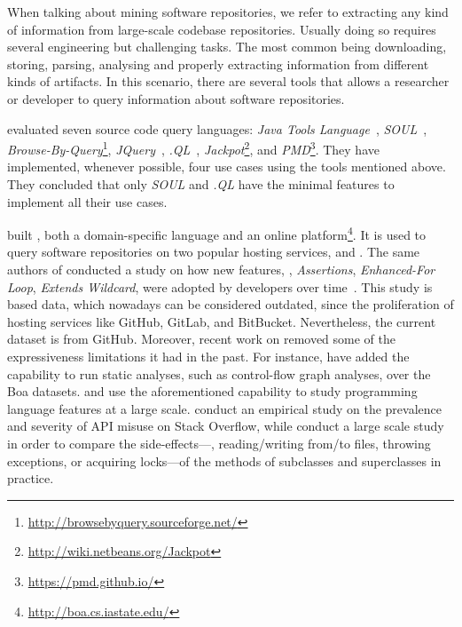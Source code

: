 When talking about mining software repositories,
we refer to extracting any kind of information from large-scale codebase repositories. 
Usually doing so requires several engineering but challenging tasks.
The most common being downloading, storing, parsing, analysing and
properly extracting information from different kinds of artifacts.
In this scenario, there are several tools that allows a researcher or developer to query information about software repositories.

\cite{urmaProgrammingLanguageEvolution2012} evaluated seven source code
query languages:
\emph{Java Tools Language}~\citep{cohenJTLJavaTools},
\emph{SOUL}~\citep{derooverSOULToolSuite2011},
\emph{Browse-By-Query}\footnote{\url{http://browsebyquery.sourceforge.net/}},
\emph{JQuery}~\citep{volderJqueryGenericCode2006},
\emph{.QL}~\citep{moorKeynoteAddressQL2007},
\emph{Jackpot}\footnote{\url{http://wiki.netbeans.org/Jackpot}}, and
\emph{PMD}\footnote{\url{https://pmd.github.io/}}.
They have implemented, whenever possible,
four use cases using the tools mentioned above.
They concluded that only \emph{SOUL} and \emph{.QL} have the minimal features to implement all their use cases.

\cite{dyerBoaLanguageInfrastructure2013,dyerDeclarativeVisitorsEase2013} built \boa{}, both a domain-specific language and an online platform\footnote{\url{http://boa.cs.iastate.edu/}}. 
It is used to query software repositories on two popular hosting services, \github{} and \sourceforge{}.
The same authors of \boa{} conducted a study on
how new \java{} features, \eg,
\emph{Assertions},
\emph{Enhanced-For Loop},
\emph{Extends Wildcard},
were adopted by developers over time~\citep{dyerMiningBillionsAST2014}.
This study is based \sourceforge{} data,
which nowadays can be considered outdated,
since the proliferation of hosting services like
GitHub, GitLab, and BitBucket.
Nevertheless, 
the current \boa{} dataset is from GitHub.
Moreover,
recent work on \boa{} removed some of the expressiveness limitations it had in the past.
For instance,
\cite{collective2018,Ramu:2018:HTE:3183440.3195033}
have added the capability to run static analyses,
such as control-flow graph analyses,
over the Boa datasets.
\cite{ReliableQA2018} and \cite{maddox18}
use the aforementioned \boa{} capability to study programming language features at a large scale.
\cite{ReliableQA2018} conduct an empirical study on the prevalence and severity of API misuse on Stack Overflow,
while \cite{maddox18} conduct a large scale study in order to compare the
side-effects---\eg{}, reading/writing from/to files, throwing exceptions, or acquiring locks---of the methods of subclasses and superclasses in practice.

